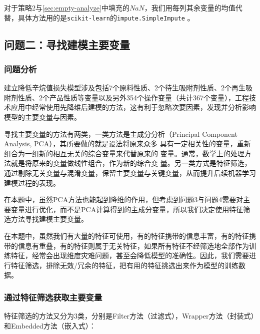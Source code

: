 \documentclass[bwprint]{gmcmthesis}
\begin{document}
对于策略2与\ref{sec:empty-analyze}中填充的$NaN$，我们用每列其余变量的均值代替，具体方法用的是\texttt{scikit-learn}的\texttt{impute.SimpleImpute} 。

\FloatBarrier
\subsection{问题二：寻找建模主要变量}
\FloatBarrier
\subsubsection{问题分析}

建立降低辛烷值损失模型涉及包括7个原料性质、2个待生吸附剂性质、2个再生吸附剂性质、2个产品性质等变量以及另外354个操作变量（共计367个变量），工程技术应用中经常使用先降维后建模的方法，这有利于忽略次要因素，发现并分析影响模型的主要变量与因素。

寻找主要变量的方法有两类，一类方法是主成分分析（Principal Component Analysis, PCA），其所要做的就是设法将原来众多
具有一定相关性的变量，重新组合为一组新的相互无关的综合变量来代替原来的
变量。通常，数学上的处理方法就是将原来的变量做线性组合，作为新的综合变
量。另一类方式是特征筛选，通过剔除无关变量与混淆变量，保留主要变量与关键变量，从而提升后续机器学习建模过程的表现。

在本题中，虽然PCA方法也能起到降维的作用，但考虑到问题3与问题4需要对主要变量进行优化，而不是PCA计算得到的主成分变量，所以我们决定使用特征筛选方法寻找建模主要变量。

在本题中，虽然我们有大量的特征可使用，有的特征携带的信息丰富，有的特征携带的信息有重叠，有的特征则属于无关特征，如果所有特征不经筛选地全部作为训练特征，经常会出现维度灾难问题，甚至会降低模型的准确性。因此，我们需要进行特征筛选，排除无效/冗余的特征，把有用的特征挑选出来作为模型的训练数据。



\FloatBarrier
\subsubsection{通过特征筛选获取主要变量}\label{sec:feature-selection}

特征筛选的方法又分为3类，分别是Filter方法（过滤式），Wrapper方法（封装式）和Embedded方法（嵌入式）：
\end{document}
